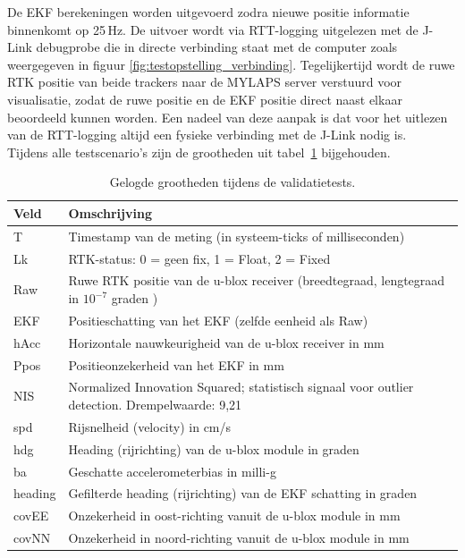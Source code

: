 De EKF berekeningen worden uitgevoerd zodra nieuwe positie informatie 
binnenkomt op 25\,Hz. De uitvoer wordt via RTT-logging uitgelezen met 
de J-Link debugprobe die in directe verbinding staat met de computer zoals weergegeven in figuur \ref{fig:testopstelling_verbinding}. Tegelijkertijd wordt de ruwe RTK positie van beide trackers naar de 
MYLAPS server verstuurd voor visualisatie, zodat de ruwe positie en de 
EKF positie direct naast elkaar beoordeeld kunnen worden. Een nadeel 
van deze aanpak is dat voor het uitlezen van de RTT-logging altijd een 
fysieke verbinding met de J-Link nodig is. \\

Tijdens alle testscenario's zijn de grootheden uit tabel~\ref{tab:logvelden} 
bijgehouden.

\newpage

\begin{table}[htbp]
    \centering
    \caption{Gelogde grootheden tijdens de validatietests.}
    \label{tab:logvelden}
    \renewcommand{\arraystretch}{1.3}
    \begin{tabularx}{\textwidth}{|l|X|}
        \hline
        \rowcolor{green!20}
        \textbf{Veld} & \textbf{Omschrijving} \\ \hline
        T & Timestamp van de meting (in systeem-ticks of milliseconden) \\ \hline
        Lk & RTK-status: 0 = geen fix, 1 = Float, 2 = Fixed \\ \hline
        Raw & Ruwe RTK positie van de u-blox receiver 
              (breedtegraad, lengtegraad in $10^{-7}$ graden \cite{ublox_x20p_interface_hpg202}) \\ \hline
        EKF & Positieschatting van het EKF 
              (zelfde eenheid als Raw) \\ \hline
        hAcc & Horizontale nauwkeurigheid van de 
               u-blox receiver in mm \\ \hline
        Ppos & Positieonzekerheid van het EKF in mm \\ \hline
        NIS & Normalized Innovation Squared; statistisch 
              signaal voor outlier detection. 
              Drempelwaarde: 9{,}21 \\ \hline
        spd & Rijsnelheid (velocity) in cm/s \\ \hline
        hdg & Heading (rijrichting) van de u-blox module in graden \\ \hline
        ba & Geschatte accelerometerbias in milli-g \\ \hline
        heading & Gefilterde heading (rijrichting) van de EKF schatting in graden \\ \hline
        covEE & Onzekerheid in oost-richting vanuit de u-blox module in mm \\ \hline
        covNN & Onzekerheid in noord-richting vanuit de u-blox module in mm \\ \hline
    \end{tabularx}
\end{table}

